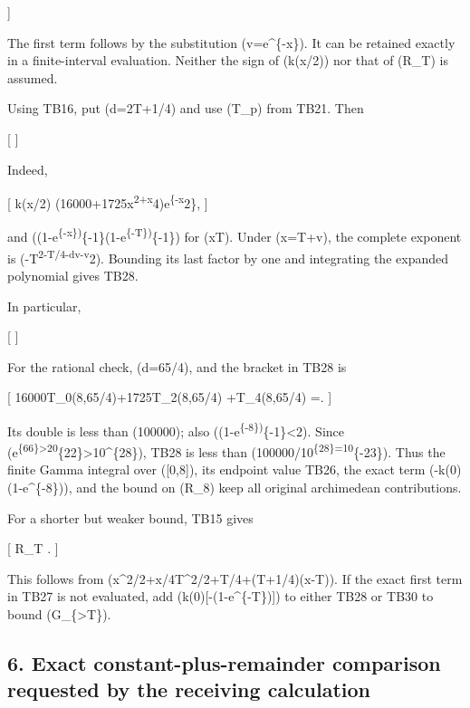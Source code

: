 \documentclass[
]{article}
\begin{document}
{]}

The first term follows by the substitution (v=e\^{}\{-x\}). It can be
retained exactly in a finite-interval evaluation. Neither the sign of
(k(x/2)) nor that of (\mathcal R\_T) is assumed.

Using TB16, put (d=2T+1/4) and use (\mathcal T\_p) from TB21. Then

{[}   {]}

Indeed,

{[} \textbar k(x/2)\textbar{}\le
\left(16000+1725x\textsuperscript{2+x}4\right)e\textsuperscript{\{-x}2\},
{]}

and
((1-e\textsuperscript{\{-x\})}\{-1\}\le(1-e\textsuperscript{\{-T\})}\{-1\})
for (x\ge T). Under (x=T+v), the complete exponent is
(-T\textsuperscript{2-T/4-dv-v}2). Bounding its last factor by one and
integrating the expanded polynomial gives TB28.

In particular,

{[}   {]}

For the rational check, (d=65/4), and the bracket in TB28 is

{[} 16000\mathcal T\_0(8,65/4)+1725\mathcal T\_2(8,65/4)
+\mathcal T\_4(8,65/4) =. {]}

Its double is less than (100000); also
((1-e\textsuperscript{\{-8\})}\{-1\}\textless2). Since
(e\textsuperscript{\{66\}\textgreater20}\{22\}\textgreater10\^{}\{28\}),
TB28 is less than (100000/10\textsuperscript{\{28\}=10}\{-23\}). Thus
the finite Gamma integral over ({[}0,8{]}), its endpoint value TB26, the
exact term (-k(0)\log(1-e\^{}\{-8\})), and the bound on (\mathcal R\_8)
keep all original archimedean contributions.

For a shorter but weaker bound, TB15 gives

{[} \textbar{}\mathcal R\_T\textbar{}\le
{}.  {]}

This follows from (x\^{}2/2+x/4\ge T\^{}2/2+T/4+(T+1/4)(x-T)). If the
exact first term in TB27 is not evaluated, add
(k(0){[}-\log(1-e\^{}\{-T\}){]}) to either TB28 or TB30 to bound
(\textbar G\_\{\textgreater T\}\textbar).

\subsection{6. Exact constant-plus-remainder comparison requested by the
receiving
calculation}\label{exact-constant-plus-remainder-comparison-requested-by-the-receiving-calculation}
\end{document}
